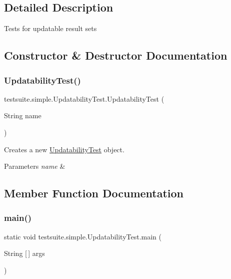 \subsection{Detailed Description}
Tests for updatable result sets 

\subsection{Constructor \& Destructor Documentation}
\mbox{\label{classtestsuite_1_1simple_1_1_updatability_test_a1ab7fd0482bf8c6fb2eec2e0bbc2be23}} 
\subsubsection{\texorpdfstring{Updatability\+Test()}{UpdatabilityTest()}}
{\footnotesize\ttfamily testsuite.\+simple.\+Updatability\+Test.\+Updatability\+Test (\begin{DoxyParamCaption}\item[{String}]{name }\end{DoxyParamCaption})}

Creates a new \mbox{\hyperlink{classtestsuite_1_1simple_1_1_updatability_test}{Updatability\+Test}} object.


\begin{DoxyParams}{Parameters}
{\em name} & \\
\hline
\end{DoxyParams}


\subsection{Member Function Documentation}
\mbox{\label{classtestsuite_1_1simple_1_1_updatability_test_aad2ca9a47cb41ccfdc8cf82a2335e1d0}} 
\subsubsection{\texorpdfstring{main()}{main()}}
{\footnotesize\ttfamily static void testsuite.\+simple.\+Updatability\+Test.\+main (\begin{DoxyParamCaption}\item[{String \mbox{[}$\,$\mbox{]}}]{args }\end{DoxyParamCaption})\hspace{0.3cm}{\ttfamily [static]}}

